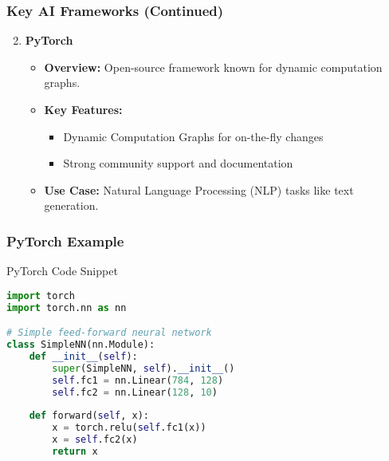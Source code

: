 \documentclass[aspectratio=169]{beamer}
\begin{document}
\begin{frame}
    \frametitle{Key AI Frameworks (Continued)}
    \begin{enumerate}
        \setcounter{enumi}{1}
        \item \textbf{PyTorch}
            \begin{itemize}
                \item \textbf{Overview:} Open-source framework known for dynamic computation graphs.
                \item \textbf{Key Features:}
                    \begin{itemize}
                        \item Dynamic Computation Graphs for on-the-fly changes
                        \item Strong community support and documentation
                    \end{itemize}
                \item \textbf{Use Case:} Natural Language Processing (NLP) tasks like text generation.
            \end{itemize}
    \end{enumerate}
\end{frame}

\begin{frame}[fragile]
    \frametitle{PyTorch Example}
    \begin{block}{PyTorch Code Snippet}
    \begin{lstlisting}[language=Python]
import torch
import torch.nn as nn

# Simple feed-forward neural network
class SimpleNN(nn.Module):
    def __init__(self):
        super(SimpleNN, self).__init__()
        self.fc1 = nn.Linear(784, 128)
        self.fc2 = nn.Linear(128, 10)
        
    def forward(self, x):
        x = torch.relu(self.fc1(x))
        x = self.fc2(x)
        return x
    \end{lstlisting}
    \end{block}
\end{frame}
\end{document}
